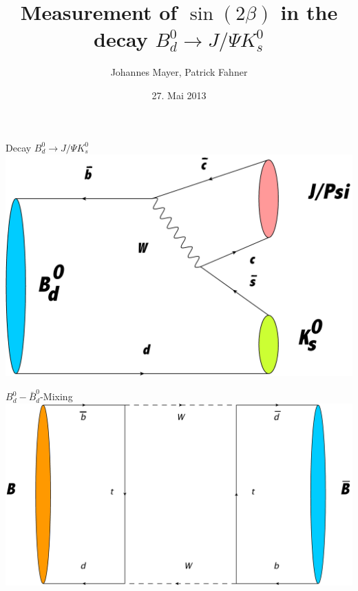 \documentclass{beamer}
\title[Measurement of $\sin(2\beta)$]{Measurement of $\sin(2\beta)$ in the decay $B_d^0 \longrightarrow J/\Psi K_s^0$}
\subtitle[]{}
\author[Johannes Mayer, Patrick Fahner]{Johannes Mayer, Patrick Fahner}
\institute[]{LHCb, Physikalisches Institut \\ Heidelberg University}
\date[27.05.13]{27. Mai 2013}
\begin{document}
\setlength\abovedisplayskip{0pt}
	\begin{frame}[plain]
	\titlepage
	\end{frame}
	
	\begin{frame}{Decay $B_d^0 \longrightarrow J/\Psi K_s^0$}
	\includegraphics[width=\textwidth]{Decay}
	\end{frame}
	
	\begin{frame}{$B_d^0-\bar{B}_d^0$-Mixing}
	\includegraphics[width=\textwidth]{Mixing}
	\end{frame}
	
\end{document}
